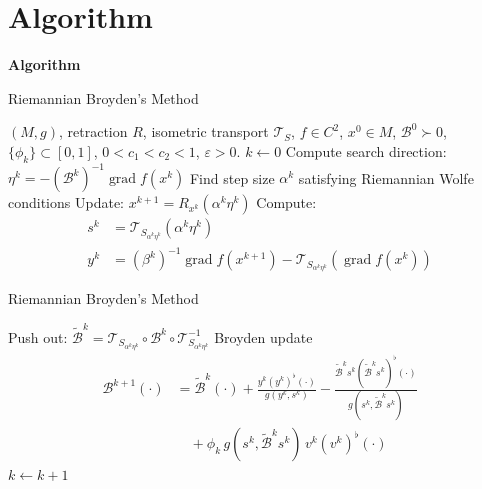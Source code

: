 \documentclass[10pt,aspectratio=169]{beamer}
\DeclareMathOperator{\grad}{grad}
\newcommand{\VT}{\mathcal{T}}
\begin{document}
\section{Algorithm}

\begin{frame}{}
\centering
\vfill
{\Huge\bfseries Algorithm}
\vfill
\end{frame}

\begin{frame}{Riemannian Broyden's Method}
\begin{algorithmic}[1]
\Require $(M,g)$, retraction $R$, isometric transport $\VT_S$, $f\in C^2$, $x^0\in M$, $\mathcal{B}^0\succ 0$, $\{\phi_k\}\subset[0,1]$, $0<c_1<c_2<1$, $\varepsilon>0$.
\State $k\gets 0$
\While{$\|\grad f(x^k)\|_{x^k}>\varepsilon$}
    \State Compute search direction: $\eta^k = -(\mathcal{B}^k)^{-1}\grad f(x^k)$
    \State Find step size $\alpha^k$ satisfying Riemannian Wolfe conditions
    \State Update: $x^{k+1} = R_{x^k}(\alpha^k\eta^k)$
    \State Compute: 
    \begin{align*}
        s^k &= \VT_{S_{\alpha^k\eta^k}}(\alpha^k\eta^k)\\
        y^k &= (\beta^k)^{-1}\grad f(x^{k+1}) - \VT_{S_{\alpha^k\eta^k}}(\grad f(x^k))
    \end{align*}
\EndWhile
\end{algorithmic}
\end{frame}

\begin{frame}{Riemannian Broyden's Method}
\begin{algorithmic}[1]
\setcounter{ALG@line}{6}
    \State Push out: $\tilde{\mathcal{B}}^k = \VT_{S_{\alpha^k\eta^k}}\circ\mathcal{B}^k\circ\VT_{S_{\alpha^k\eta^k}}^{-1}$
    \State Broyden update
    \begin{align*}
        \mathcal{B}^{k+1}(\cdot) &= \tilde{\mathcal{B}}^k(\cdot) + \frac{y^k(y^k)^\flat(\cdot)}{g(y^k,s^k)} - \frac{\tilde{\mathcal{B}}^ks^k(\tilde{\mathcal{B}}^ks^k)^\flat(\cdot)}{g(s^k,\tilde{\mathcal{B}}^ks^k)}\\
        &\quad + \phi_k\,g(s^k,\tilde{\mathcal{B}}^ks^k)\,v^k(v^k)^\flat(\cdot)
    \end{align*}
    \State $k\gets k+1$
\end{algorithmic}
\end{frame}

\end{document}
